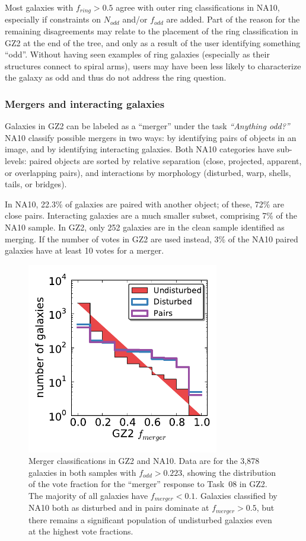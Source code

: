 \documentclass[useAMS,usenatbib]{mn2e}
\begin{document}
Most galaxies with $f_{ring}>0.5$ agree with outer ring classifications in NA10, especially if constraints on $N_{odd}$ and/or $f_{odd}$ are added. Part of the reason for the remaining disagreements may relate to the placement of the ring classification in GZ2 at the end of the tree, and only as a result of the user identifying something ``odd''. Without having seen examples of ring galaxies (especially as their structures connect to spiral arms), users may have been less likely to characterize the galaxy as odd and thus do not address the ring question. 

\subsubsection{Mergers and interacting galaxies}

Galaxies in GZ2 can be labeled as a ``merger'' under the task {\it ``Anything odd?''} NA10 classify possible mergers in two ways: by identifying pairs of objects in an image, and by identifying interacting galaxies. Both NA10 categories have sub-levels: paired objects are sorted by relative separation (close, projected, apparent, or overlapping pairs), and interactions by morphology (disturbed, warp, shells, tails, or bridges). 

In NA10, 22.3\% of galaxies are paired with another object; of these, 72\% are close pairs. Interacting galaxies are a much smaller subset, comprising 7\% of the NA10 sample. In GZ2, only 252 galaxies are in the clean sample identified as merging. If the number of votes in GZ2 are used instead, 3\% of the NA10 paired galaxies have at least 10 votes for a merger. 

\begin{figure}
\includegraphics[angle=0,width=3.3in]{figures/na_gz2_mergers.pdf}
\caption{Merger classifications in GZ2 and NA10. Data are for the 3,878 galaxies in both samples with $f_{odd}>0.223$, showing the distribution of the vote fraction for the ``merger'' response to Task~08 in GZ2. The majority of all galaxies have $f_{merger}<0.1$. Galaxies classified by NA10 both as disturbed and in pairs dominate at $f_{merger}>0.5$, but there remains a significant population of undisturbed galaxies even at the highest vote fractions.
\label{fig-na_pairs}}
\end{figure}
\end{document}
